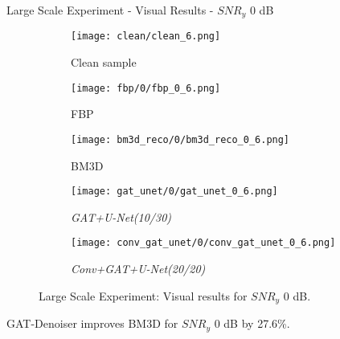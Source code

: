 \begin{frame}{Large Scale Experiment - Visual Results - $SNR_y$ 0 dB}
\begin{figure}
    \captionsetup[subfigure]{justification=centering}
    \centering
    \begin{subfigure}[t]{0.18\textwidth}
      \texttt{[image: clean/clean\_6.png]}
      \caption{Clean sample}
    \end{subfigure} \hfill
    \begin{subfigure}[t]{0.18\textwidth}
      \texttt{[image: fbp/0/fbp\_0\_6.png]}
      \caption{FBP}
    \end{subfigure} \hfill
    \begin{subfigure}[t]{0.18\textwidth}
      \texttt{[image: bm3d\_reco/0/bm3d\_reco\_0\_6.png]}
      \caption{BM3D}
    \end{subfigure} \hfill
    \begin{subfigure}[t]{0.18\textwidth}
      \texttt{[image: gat\_unet/0/gat\_unet\_0\_6.png]}
      \caption{\textit{GAT+U-Net(10/30)}}
    \end{subfigure} \hfill
    \begin{subfigure}[t]{0.18\textwidth}
      \texttt{[image: conv\_gat\_unet/0/conv\_gat\_unet\_0\_6.png]}
      \caption{\textit{Conv+GAT+U-Net(20/20)}}
    \end{subfigure} \hfill
    \caption{Large Scale Experiment: Visual results for $SNR_y$ 0 dB.}
  \end{figure}
  

  \begin{tcolorbox}[colback=red!5!white,hide=<1>, alert=<2>, colframe=red!75!black]
    GAT-Denoiser improves BM3D for $SNR_y$ 0 dB  by 27.6\%.
    \end{tcolorbox}
    
\end{frame}


